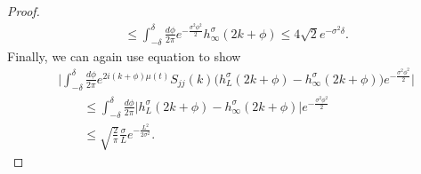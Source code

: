 \documentclass[../thesis-main/thesis-main]{subfiles}
\begin{document}
\begin{proof}
\begin{align}
    & \leq \int_{-\delta}^\delta \frac{d\phi}{2\pi}  e^{-\frac{\sigma^2\phi^2}{2}} h_{\infty}^\sigma(2k+\phi) \leq 4 \sqrt{2} e^{ - \sigma^2 \delta}.
\end{align}
Finally, we can again use equation  to show
\begin{align}
  &\Bigg| \int_{-\delta}^\delta \frac{d\phi}{2\pi} e^{2 i (k+\phi) \mu(t)} S_{jj}(k) \big( h_{L}^\sigma(2k + \phi) - h_{\infty}^\sigma(2k + \phi) \big)e^{-\frac{\sigma^2\phi^2}{2}}\Bigg|  \nonumber\\
  &\qquad\leq \int_{-\delta}^\delta \frac{d\phi}{2\pi} \big| h_{L}^\sigma(2k + \phi) - h_{\infty}^\sigma(2k + \phi) \big|e^{-\frac{\sigma^2\phi^2}{2}}\\
  & \qquad \leq \sqrt{\frac{2}{\pi}} \frac{\sigma}{L} e^{-\frac{L^2}{2\sigma^2}}.
\end{align}


\end{proof}
\end{document}
